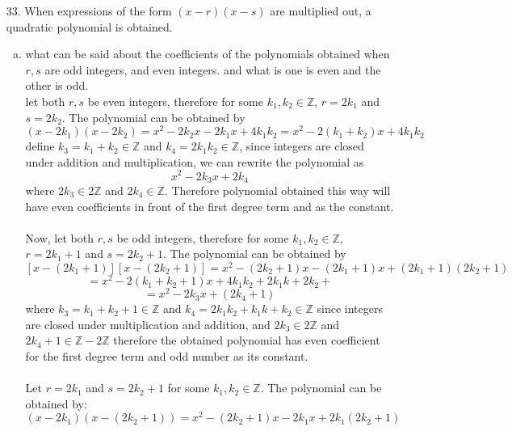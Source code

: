 \documentclass[12pt]{article}
\newcommand{\Z}{\mathbb{Z}}
\newcommand{\sqbkt}[1]{\left[ #1 \right]}
\begin{document}
\begin{enumerate}
\begin{enumerate}
                \item[33.] When expressions of the form $(x-r)(x-s)$ are multiplied out, a quadratic polynomial is obtained. 
                    \begin{enumerate}[a.]
                        \item what can be said about the coefficients of the polynomials obtained when $r,s$ are odd integers, and even integers. and what is one is even and the other is odd. \\
                        let both $r,s$ be even integers, therefore for some $k_1, k_2 \in \Z$, $r = 2k_1$ and $s = 2k_2$. The polynomial can be obtained by
                        \[
                        (x-2k_1)(x-2k_2) = x^2 - 2k_2x - 2k_1x + 4k_1k_2 = x^2 - 2(k_1+k_2)x + 4k_1k_2
                        \]
                        define $k_3 = k_1 + k_2 \in \Z$ and $k_4 = 2k_1k_2 \in \Z$, since integers are closed under addition and multiplication, we can rewrite the polynomial as
                        \[
                        x^2 - 2k_3x + 2k_4
                        \]
                        where $2k_3 \in 2\Z$ and $2k_4 \in \Z$. Therefore polynomial obtained this way will have even coefficients in front of the first degree term and as the constant. 
                        \\\\
                        Now, let both $r,s$ be odd integers, therefore for some $k_1, k_2 \in \Z$, $r = 2k_1+1$ and $s = 2k_2+1$. The polynomial can be obtained by
                        \[
                        \sqbkt{x-(2k_1+1)}\sqbkt{x-(2k_2+1)} = x^2 - (2k_2+1)x - (2k_1+1)x + (2k_1+1)(2k_2+1) 
                        \]
                        \[
                        = x^2 - 2(k_1+k_2 + 1)x + 4k_1k_2+2k_1k+2k_2 + 
                        \]
                        \[
                        = x^2 - 2k_3x + (2k_4+1)
                        \]
                        where $k_3 = k_1+k_2 + 1 \in \Z$ and $ k_4 = 2k_1k_2+k_1k+k_2 \in \Z$ since integers are closed under multiplication and addition, and $2k_3 \in 2\Z$ and $ 2k_4 + 1 \in \Z - 2\Z$ therefore the obtained polynomial has even coefficient for the first degree term and odd number as its constant. 
                        \\\\
                        Let \( r = 2k_1 \) and \( s = 2k_2 + 1 \) for some \( k_1, k_2 \in \mathbb{Z} \). The polynomial can be obtained by:
                        \[
                        (x - 2k_1)(x - (2k_2 + 1)) = x^2 - (2k_2 + 1)x - 2k_1 x + 2k_1 (2k_2 + 1)
\]
\end{enumerate}
\end{enumerate}
\end{enumerate}
\end{document}
